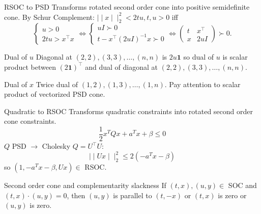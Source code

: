 \documentclass{beamer}
\def\lVert{\mid\!\mid}
\def\rVert{\mid\!\mid}
\begin{document}
\begin{frame}{RSOC to PSD}
  Transforms rotated second order cone into positive semidefinite cone.
  By Schur Complement: $\lVert x\rVert_2^2 < 2tu, t, u > 0$ iff
  $$
  \begin{cases}
    u > 0\\
    2tu > x^\top x
  \end{cases}
  \Leftrightarrow
  \begin{cases}
    uI \succ 0\\
    t - x^\top (2uI)^{-1} x \succ 0
  \end{cases}
  \Leftrightarrow
  \begin{pmatrix}
    t & x^\top\\
    x & 2uI
  \end{pmatrix} \succ 0.
  $$
  \begin{block}{Dual of $u$}
    Diagonal at $(2,2), (3, 3), \ldots, (n, n)$ is $2u \mathbf{1}$ so
    dual of $u$ is scalar product between $(2\mathbf{1})^\top$ and dual of
    diagonal at $(2,2), (3, 3), \ldots, (n, n)$.
  \end{block}
  \begin{block}{Dual of $x$}
    Twice dual of $(1, 2), (1, 3), \ldots, (1, n)$.
    Pay attention to scalar product of vectorized PSD cone.
  \end{block}
\end{frame}

\begin{frame}{Quadratic to RSOC}
  Transforms quadratic constraints into rotated second order cone constraints.
  $$\frac{1}{2}x^T Q x + a^T x + \beta \le 0$$
  $Q$ PSD $\to$ Cholesky $Q = U^\top U$:
  $$\lVert U x\rVert_2^2 \le 2 (-a^T x - \beta)$$
  so $(1, -a^T x - \beta, Ux) \in {}$ RSOC.
\end{frame}

\begin{frame}{Second order cone and complementarity slackness}
  If $(t, x), (u, y) \in {}$ SOC and $(t, x) \cdot (u, y) = 0$,
  then $(u, y)$ is parallel to $(t, -x)$ or $(t, x)$ is zero or $(u, y)$ is zero.
  \begin{center}
  \end{center}
\end{frame}
\end{document}
